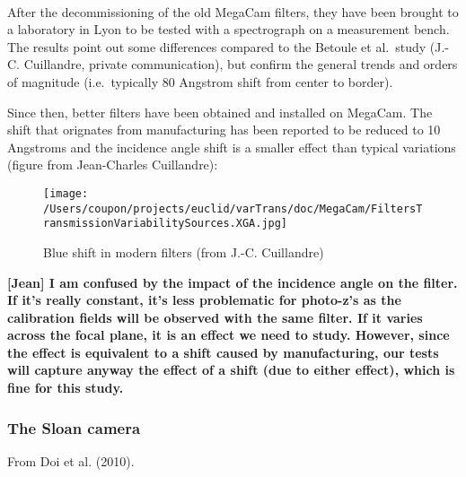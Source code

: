 \documentclass{article}
\makeatletter
\def\maxwidth{\ifdim\Gin@nat@width>\linewidth\linewidth
    \else\Gin@nat@width\fi}
\let\Oldincludegraphics\includegraphics
\renewcommand{\includegraphics}[1]{\Oldincludegraphics[width=.8\maxwidth]{#1}}
\makeatother
\begin{document}
    \begin{center}
    \end{center}
    { \hspace*{\fill} \\}
    
    After the decommissioning of the old MegaCam filters, they have been
brought to a laboratory in Lyon to be tested with a spectrograph on a
measurement bench. The results point out some differences compared to
the Betoule et al.~study (J.-C. Cuillandre, private communication), but
confirm the general trends and orders of magnitude (i.e.~typically 80
Angstrom shift from center to border).

Since then, better filters have been obtained and installed on MegaCam.
The shift that orignates from manufacturing has been reported to be
reduced to 10 Angstroms and the incidence angle shift is a smaller
effect than typical variations (figure from Jean-Charles Cuillandre):

\begin{figure}
\centering
\texttt{[image: /Users/coupon/projects/euclid/varTrans/doc/MegaCam/FiltersTransmissionVariabilitySources.XGA.jpg]}
\caption{Blue shift in modern filters (from J.-C. Cuillandre)}
\end{figure}

\textbf{{[}Jean{]} I am confused by the impact of the incidence angle on
the filter. If it's really constant, it's less problematic for photo-z's
as the calibration fields will be observed with the same filter. If it
varies across the focal plane, it is an effect we need to study.
However, since the effect is equivalent to a shift caused by
manufacturing, our tests will capture anyway the effect of a shift (due
to either effect), which is fine for this study.}

    \hypertarget{the-sloan-camera}{%
\subsubsection{The Sloan camera}\label{the-sloan-camera}}

From Doi et al. (2010).


    \begin{center}
    \end{center}
    { \hspace*{\fill} \\}
    
\end{document}
